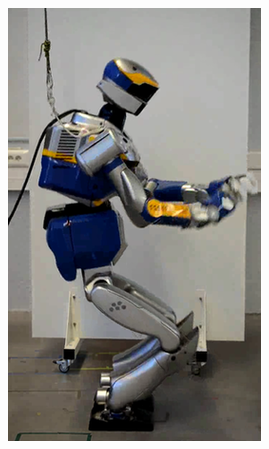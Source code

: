 \begin{figure}
\begin{subfigure}{0.19\columnwidth}
    \includegraphics[width = \columnwidth]
                    {src/chap3-optimal-motion-planning/figure/self-collision-7.png}
    \label{self-collision-7}
  \end{subfigure}
  \begin{subfigure}{0.19\columnwidth}
    \centering

\end{subfigure}
\end{figure}

